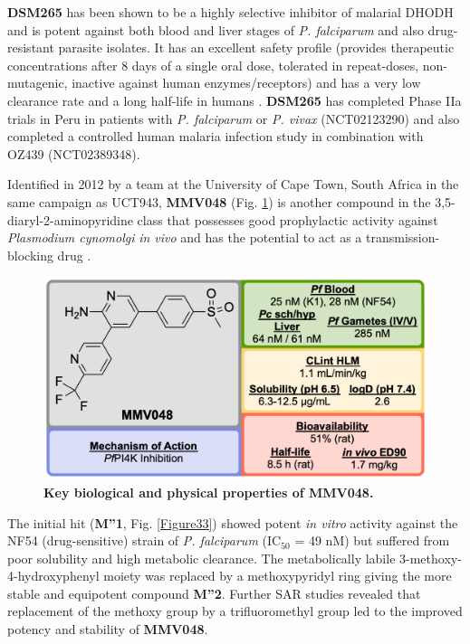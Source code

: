\documentclass[twocolumn]{bmcart}%
\begin{document}
\textbf{DSM265} has been shown to be a highly selective inhibitor of malarial DHODH and is potent against both blood and liver stages of \textit{P. falciparum} and also drug-resistant parasite isolates. It has an excellent safety profile (provides therapeutic concentrations after 8 days of a single oral dose, tolerated in repeat-doses, non-mutagenic, inactive against human enzymes/receptors) and has a very low clearance rate and a long half-life in humans \cite{McCarthy2017}. \textbf{DSM265} has completed Phase IIa trials in Peru in patients with \textit{P. falciparum} or \textit{P. vivax} (NCT02123290) and also completed a controlled human malaria infection study in combination with OZ439 (NCT02389348).

\hrulefill

Identified in 2012 by a team at the University of Cape Town, South Africa in the same campaign as UCT943, \textbf{MMV048} (Fig. \ref{Figure32}) is another compound in the 3,5-diaryl-2-aminopyridine class that possesses good prophylactic activity against \textit{Plasmodium cynomolgi} \textit{in vivo} and has the potential to act as a transmission-blocking drug \cite{Younis2012}.

\begin{figure}[h]
	\includegraphics [scale=0.575] {Figure32}
	\caption{\bf Key biological and physical properties of MMV048.}
	\label{Figure32}
\end{figure}

The initial hit (\textbf{M''1}, Fig. \ref{Figure33}) showed potent \textit{in vitro} activity against the NF54 (drug-sensitive) strain of \textit{P. falciparum} (IC$_{50}$ = 49 nM) but suffered from poor solubility and high metabolic clearance. The metabolically labile 3-methoxy-4-hydroxyphenyl moiety was replaced by a methoxypyridyl ring giving the more stable and equipotent compound \textbf{M''2}. Further SAR studies revealed that replacement of the methoxy group by a trifluoromethyl group led to the improved potency and stability of \textbf{MMV048}. 
\end{document}
